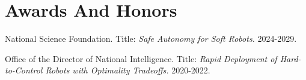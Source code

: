 \documentclass[letterpaper]{deedy-resume} %
\begin{document}
{{}
  
{}





\vspace{0.2cm}
\section{Awards And Honors}

\vspace{0.1cm}


\begin{etaremune}[itemsep=0.05cm]



\item {{} National Science Foundation. Title: {\it Safe Autonomy for Soft Robots.} 2024-2029.}

\item {{} Office of the Director of National Intelligence. Title: {\it Rapid Deployment of Hard-to-Control Robots with Optimality Tradeoffs.} 2020-2022.}


\end{etaremune}}
\end{document}
